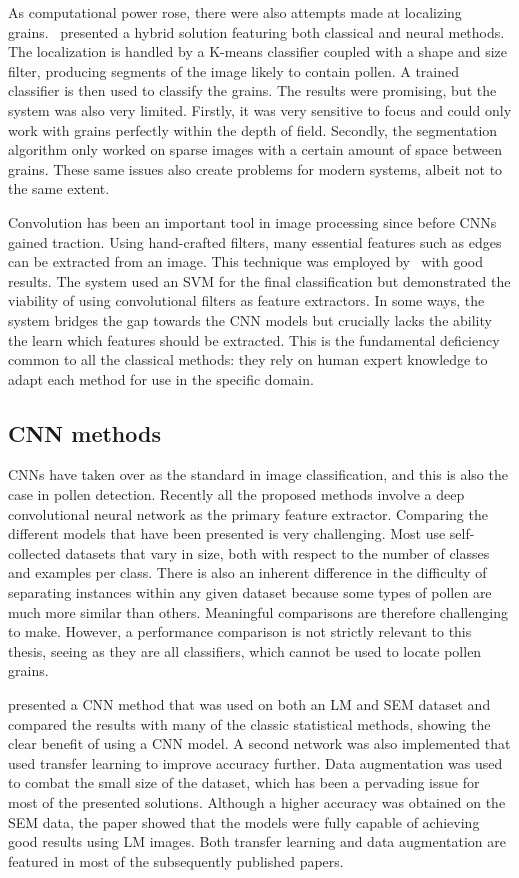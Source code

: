 As computational power rose, there were also attempts made at localizing grains.\ \cite{france_new_2000} presented a hybrid solution featuring both classical and neural methods.
The localization is handled by a K-means classifier coupled with a shape and size filter, producing segments of the image likely to contain pollen.
A trained classifier is then used to classify the grains.
The results were promising, but the system was also very limited.
Firstly, it was very sensitive to focus and could only work with grains perfectly within the depth of field.
Secondly, the segmentation algorithm only worked on sparse images with a certain amount of space between grains.
These same issues also create problems for modern systems, albeit not to the same extent.

Convolution has been an important tool in image processing since before CNNs gained traction.
Using hand-crafted filters, many essential features such as edges can be extracted from an image.
This technique was employed by\ \textcite{DaoodICPR16b} with good results.
The system used an SVM for the final classification but demonstrated the viability of using convolutional filters as feature extractors.
In some ways, the system bridges the gap towards the CNN models but crucially lacks the ability the learn which features should be extracted.
This is the fundamental deficiency common to all the classical methods: they rely on human expert knowledge to adapt each method for use in the specific domain.

\subsection{CNN methods}
CNNs have taken over as the standard in image classification, and this is also the case in pollen detection.
Recently all the proposed methods involve a deep convolutional neural network as the primary feature extractor.
Comparing the different models that have been presented is very challenging.
Most use self-collected datasets that vary in size, both with respect to the number of classes and examples per class.
There is also an inherent difference in the difficulty of separating instances within any given dataset because some types of pollen are much more similar than others.
Meaningful comparisons are therefore challenging to make.
However, a performance comparison is not strictly relevant to this thesis, seeing as they are all classifiers, which cannot be used to locate pollen grains.

{\cite{daood_pollen_2016}} presented a CNN method that was used on both an LM and SEM dataset and compared the results with many of the classic statistical methods, showing the clear benefit of using a CNN model.
A second network was also implemented that used transfer learning to improve accuracy further.
Data augmentation was used to combat the small size of the dataset, which has been a pervading issue for most of the presented solutions.
Although a higher accuracy was obtained on the SEM data, the paper showed that the models were fully capable of achieving good results using LM images.
Both transfer learning and data augmentation are featured in most of the subsequently published papers.

